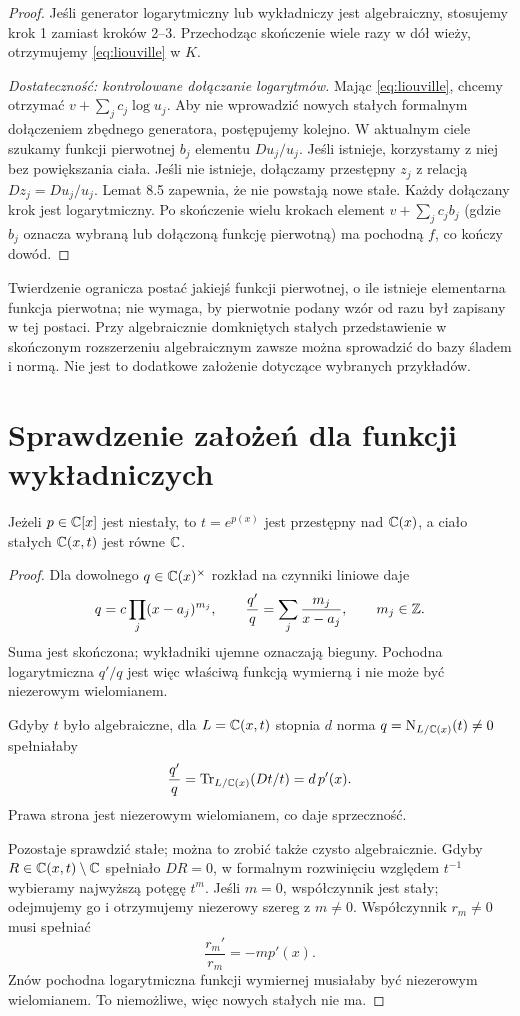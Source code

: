 \begin{proof}
Jeśli generator logarytmiczny lub wykładniczy jest algebraiczny, stosujemy krok 1 zamiast kroków 2--3. Przechodząc skończenie wiele razy w dół wieży, otrzymujemy \eqref{eq:liouville} w $K$.

\emph{Dostateczność: kontrolowane dołączanie logarytmów.} Mając \eqref{eq:liouville}, chcemy otrzymać $v+\sum_j c_j\log u_j$. Aby nie wprowadzić nowych stałych formalnym dołączeniem zbędnego generatora, postępujemy kolejno. W aktualnym ciele szukamy funkcji pierwotnej $b_j$ elementu $Du_j/u_j$. Jeśli istnieje, korzystamy z niej bez powiększania ciała. Jeśli nie istnieje, dołączamy przestępny $z_j$ z relacją $Dz_j=Du_j/u_j$. Lemat 8.5 zapewnia, że nie powstają nowe stałe. Każdy dołączany krok jest logarytmiczny. Po skończenie wielu krokach element $v+\sum_j c_jb_j$ (gdzie $b_j$ oznacza wybraną lub dołączoną funkcję pierwotną) ma pochodną $f$, co kończy dowód.
\end{proof}

\begin{uwaga}
Twierdzenie ogranicza postać jakiejś funkcji pierwotnej, o ile istnieje elementarna funkcja pierwotna; nie wymaga, by pierwotnie podany wzór od razu był zapisany w tej postaci. Przy algebraicznie domkniętych stałych przedstawienie w skończonym rozszerzeniu algebraicznym zawsze można sprowadzić do bazy śladem i normą. Nie jest to dodatkowe założenie dotyczące wybranych przykładów.
\end{uwaga}

\section{Sprawdzenie założeń dla funkcji wykładniczych}

\begin{lemat}
Jeżeli $p\in\mathbb{C}[x]$ jest niestały, to $t=e^{p(x)}$ jest przestępny nad $\mathbb{C}(x)$, a ciało stałych $\mathbb{C}(x,t)$ jest równe $\mathbb{C}$.
\end{lemat}
\begin{proof}
Dla dowolnego $q\in\mathbb{C}(x)^\times$ rozkład na czynniki liniowe daje
\[
q=c\prod_j(x-a_j)^{m_j},\qquad
\frac{q'}{q}=\sum_j\frac{m_j}{x-a_j},\qquad m_j\in\mathbb{Z}.
\]
Suma jest skończona; wykładniki ujemne oznaczają bieguny. Pochodna logarytmiczna $q'/q$ jest więc właściwą funkcją wymierną i nie może być niezerowym wielomianem.

Gdyby $t$ było algebraiczne, dla $L=\mathbb{C}(x,t)$ stopnia $d$ norma $q=\operatorname{N}_{L/\mathbb{C}(x)}(t)\ne0$ spełniałaby
\[
\frac{q'}{q}=\operatorname{Tr}_{L/\mathbb{C}(x)}(Dt/t)=d\,p'(x).
\]
Prawa strona jest niezerowym wielomianem, co daje sprzeczność.

Pozostaje sprawdzić stałe; można to zrobić także czysto algebraicznie. Gdyby $R\in\mathbb{C}(x,t)\setminus\mathbb{C}$ spełniało $DR=0$, w formalnym rozwinięciu względem $t^{-1}$ wybieramy najwyższą potęgę $t^m$. Jeśli $m=0$, współczynnik jest stały; odejmujemy go i otrzymujemy niezerowy szereg z $m\ne0$. Współczynnik $r_m\ne0$ musi spełniać
\[
\frac{r_m'}{r_m}=-m p'(x).
\]
Znów pochodna logarytmiczna funkcji wymiernej musiałaby być niezerowym wielomianem. To niemożliwe, więc nowych stałych nie ma.
\end{proof}

